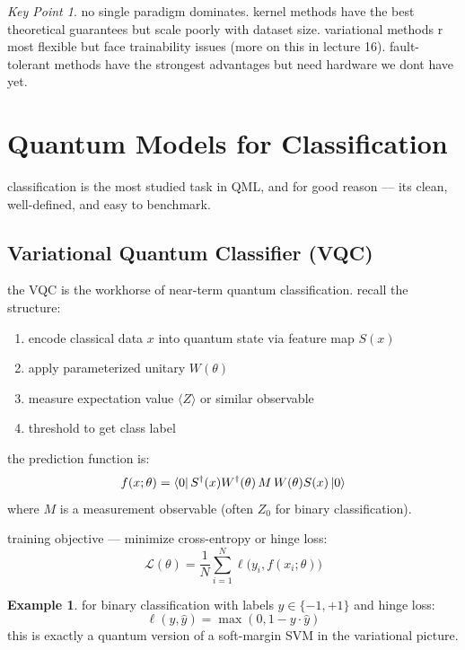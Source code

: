 \documentclass[11pt,a4paper]{article}
\theoremstyle{definition}
\newtheorem{example}{Example}[section]
\theoremstyle{remark}
\newtheorem*{keypoint}{Key Point}
\begin{document}
\begin{keypoint}
no single paradigm dominates. kernel methods have the best theoretical guarantees but scale poorly with dataset size. variational methods r most flexible but face trainability issues (more on this in lecture 16). fault-tolerant methods have the strongest advantages but need hardware we dont have yet.
\end{keypoint}

\section{Quantum Models for Classification}

classification is the most studied task in QML, and for good reason --- its clean, well-defined, and easy to benchmark.

\subsection{Variational Quantum Classifier (VQC)}

the VQC is the workhorse of near-term quantum classification. recall the structure:

\begin{enumerate}[label=(\roman*)]
    \item encode classical data $x$ into quantum state via feature map $S(x)$
    \item apply parameterized unitary $W(\theta)$
    \item measure expectation value $\langle Z \rangle$ or similar observable
    \item threshold to get class label
\end{enumerate}

the prediction function is:
\begin{equation}
    f(x; \theta) = \bra{0} S^\dagger(x) W^\dagger(\theta) \, M \, W(\theta) S(x) \ket{0}
\end{equation}
where $M$ is a measurement observable (often $Z_0$ for binary classification).

training objective --- minimize cross-entropy or hinge loss:
\begin{equation}
    \mathcal{L}(\theta) = \frac{1}{N} \sum_{i=1}^{N} \ell\big(y_i, f(x_i; \theta)\big)
\end{equation}

\begin{example}
for binary classification with labels $y \in \{-1, +1\}$ and hinge loss:
\[
\ell(y, \hat{y}) = \max(0, 1 - y \cdot \hat{y})
\]
this is exactly a quantum version of a soft-margin SVM in the variational picture.
\end{example}
\end{document}
